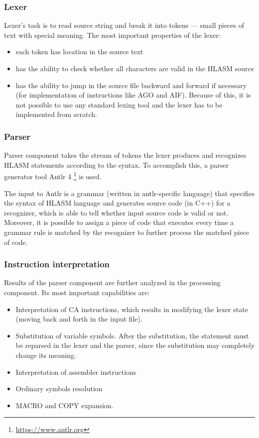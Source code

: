 \subsubsection{Lexer}

Lexer's task is to read source string and break it into tokens --- small pieces of text with special meaning. The most important properties of the lexer:
\begin{itemize}
	\item each token has location in the source text
	\item has the ability to check whether all characters are valid in the HLASM source
	\item has the ability to jump in the source file backward and forward if necessary (for implementation of instructions like AGO and AIF). Because of this, it is not possible to use any standard lexing tool and the lexer has to be implemented from scratch.
\end{itemize}

\subsubsection{Parser}

Parser component takes the stream of tokens the lexer produces and recognizes HLASM statements according to the syntax. To accomplish this, a parser generator tool Antlr 4 \footnote{\url{https://www.antlr.org}} is used.

The input to Antlr is a grammar (written in antlr-specific language) that specifies the syntax of HLASM language and generates source code (in C++) for a recognizer, which is able to tell whether input source code is valid or not. Moreover, it is possible to assign a piece of code that executes every time a grammar rule is matched by the recognizer to further process the matched piece of code.

\subsubsection{Instruction interpretation}

Results of the parser component are further analyzed in the processing component. Its most important capabilities are:
\begin{itemize}
	\item Interpretation of CA instructions, which results in modifying the lexer state (moving back and forth in the input file).
	\item Substitution of variable symbols. After the substitution, the statement must be reparsed in the lexer and the parser, since the substitution may completely change its meaning.
	\item Interpretation of assembler instructions
	\item Ordinary symbols resolution
	\item MACRO and COPY expansion.
\end{itemize}

